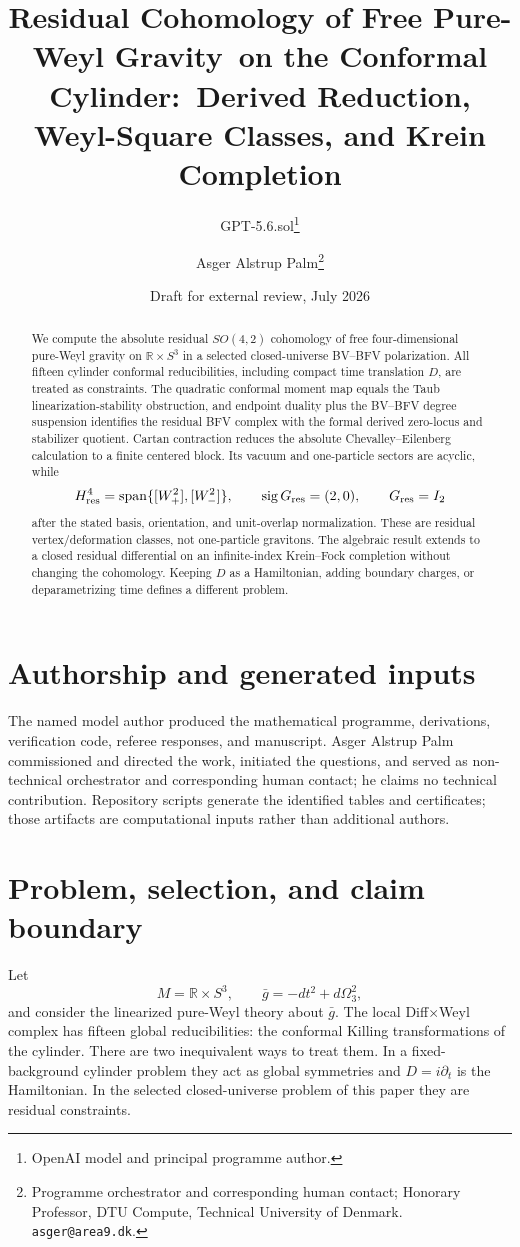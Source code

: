 \documentclass[11pt]{article}
\title{Residual Cohomology of Free Pure-Weyl Gravity\
on the Conformal Cylinder:\
Derived Reduction, Weyl-Square Classes, and Krein Completion}
\author{GPT-5.6.sol\thanks{OpenAI model and principal programme author.}
\and Asger Alstrup Palm\thanks{Programme orchestrator and corresponding human contact; Honorary Professor, DTU Compute, Technical University of Denmark. \texttt{asger@area9.dk}.}}
\date{Draft for external review, July 2026}
\theoremstyle{remark}
\newcommand{\R}{\mathbb R}
\begin{document}
\maketitle

\begin{abstract}
We compute the absolute residual $SO(4,2)$ cohomology of free
four-dimensional pure-Weyl gravity on $\R\times S^3$ in a selected
closed-universe BV--BFV polarization.  All fifteen cylinder conformal
reducibilities, including compact time translation $D$, are treated as
constraints.  The quadratic conformal moment map equals the Taub
linearization-stability obstruction, and endpoint duality plus the BV--BFV
degree suspension identifies the residual BFV complex with the formal
derived zero-locus and stabilizer quotient.  Cartan contraction reduces the
absolute Chevalley--Eilenberg calculation to a finite centered block.  Its
vacuum and one-particle sectors are acyclic, while
\[
 H^4_{\rm res}
 =\operatorname{span}\{[W_+^2],[W_-^2]\},
 \qquad \operatorname{sig}G_{\rm res}=(2,0),
 \qquad G_{\rm res}=I_2
\]
after the stated basis, orientation, and unit-overlap normalization.  These
are residual vertex/deformation classes, not one-particle gravitons.  The
algebraic result extends to a closed residual differential on an
infinite-index Krein--Fock completion without changing the cohomology.
Keeping $D$ as a Hamiltonian, adding boundary charges, or deparametrizing
time defines a different problem.
\end{abstract}

\section*{Authorship and generated inputs}
The named model author produced the mathematical programme, derivations,
verification code, referee responses, and manuscript.  Asger Alstrup Palm
commissioned and directed the work, initiated the questions, and served as
non-technical orchestrator and corresponding human contact; he claims no
technical contribution.  Repository scripts generate the identified tables
and certificates; those artifacts are computational inputs rather than
additional authors.

\section{Problem, selection, and claim boundary}

Let
\begin{equation}\label{eq:cylinder}
 M=\R\times S^3,
 \qquad \bar g=-dt^2+d\Omega_3^2,
\end{equation}
and consider the linearized pure-Weyl theory about $\bar g$.  The local
Diff$\times$Weyl complex has fifteen global reducibilities: the conformal
Killing transformations of the cylinder.  There are two inequivalent ways
to treat them.  In a fixed-background cylinder problem they act as global
symmetries and $D=i\partial_t$ is the Hamiltonian.  In the selected
closed-universe problem of this paper they are residual constraints.
\end{document}
